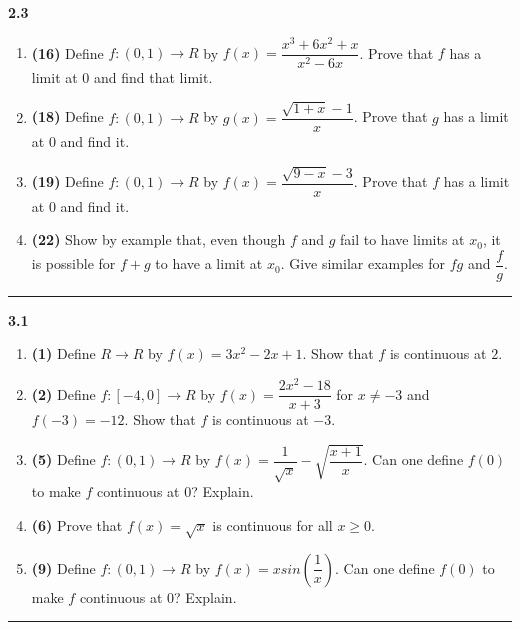 \documentclass[fleqn]{article}
\begin{document}
  \textbf{2.3}
  \begin{enumerate}
    \item \textbf{(16)} Define $f: (0, 1) \longrightarrow R$ by $f(x)=\dfrac{x^3+6x^2+x}{x^2-6x}$. Prove that $f$ 
    has a limit at $0$ and find that limit. 


    \item \textbf{(18)} Define $f: (0, 1) \longrightarrow R$ by $g(x)=\dfrac{\sqrt{1+x}-1}{x}$. Prove that $g$ has a limit
    at $0$ and find it.


    \item \textbf{(19)} Define $f: (0, 1) \longrightarrow R$ by $f(x)=\dfrac{\sqrt{9-x}-3}{x}$. Prove that $f$ has a limit 
    at $0$ and find it.


    \item \textbf{(22)} Show by example that, even though $f$ and $g$ fail to have limits at $x_0$, it is possible for
    $f+g$ to have a limit at $x_0$. Give similar examples for $fg$ and $\dfrac{f}{g}$.


  \end{enumerate}

  \rule{15cm}{2pt}

  \textbf{3.1}
  \begin{enumerate}
    \item \textbf{(1)} Define $R \longrightarrow R$ by $f(x)=3x^2-2x+1$. Show that $f$ is continuous at $2$.


    \item \textbf{(2)} Define $f: [-4, 0] \longrightarrow R$ by $f(x)=\dfrac{2x^2-18}{x+3}$ for $x \neq -3$ and $f(-3)=-12$. Show 
    that $f$ is continuous at $-3$.


    \item \textbf{(5)} Define $f: (0, 1) \longrightarrow R$ by $f(x)=\dfrac{1}{\sqrt{x}}-\sqrt{\dfrac{x+1}{x}}$. Can one define
    $f(0)$ to make $f$ continuous at $0$? Explain. 


    \item \textbf{(6)} Prove that $f(x)=\sqrt{x}$ is continuous for all $x \geq 0$.
    

    \item \textbf{(9)} Define $f: (0, 1) \longrightarrow R$ by $f(x)=x sin(\dfrac{1}{x})$. Can one define
    $f(0)$ to make $f$ continuous at $0$? Explain.

  \end{enumerate}  

  \rule{15cm}{2pt}
\end{document}
